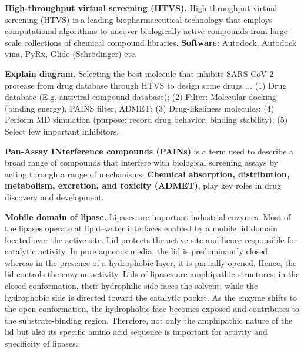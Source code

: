 \vspace{0.1em}\noindent
\textbf{High-throughput virtual screening (HTVS).} High-throughput virtual screening (HTVS) is a leading biopharmaceutical technology that employs computational algorithms to uncover biologically active compounds from large-scale collections of chemical compound libraries. \textbf{Software}: Autodock, Autodock vina, PyRx, Glide (Schrödinger) etc.

\vspace{0.1em}\noindent
\textbf{Explain diagram.} Selecting the best molecule that inhibits SARS-CoV-2 protease from drug database through HTVS to design some drugs ... (1) Drug database (E.g. antiviral compound database); (2) Filter: Molecular docking (binding energy), PAINS filter, ADMET; (3) Drug-likeliness molecules; (4) Perform MD simulation (purpose: record drug behavior, binding stability); (5) Select few important inhibitors. 

\vspace{0.1em}\noindent
\textbf{Pan-Assay INterference compounds (PAINs)} is a term used to describe a broad range of compounds that interfere with biological screening assays by acting through a range of mechanisms. \textbf{ Chemical absorption, distribution, metabolism, excretion, and toxicity (ADMET)}, play key roles in drug discovery and development. 

\vspace{0.1em}\noindent
\textbf{Mobile domain of lipase.} Lipases are important industrial enzymes. Most of the lipases operate at lipid–water interfaces enabled by a mobile lid domain located over the active site. Lid protects the active site and hence responsible for catalytic activity. In pure aqueous media, the lid is predominantly closed, whereas in the presence of a hydrophobic layer, it is partially opened. Hence, the lid controls the enzyme activity.
Lids of lipases are amphipathic structures; in the closed conformation, their hydrophilic side faces the solvent, while the hydrophobic side is directed toward the catalytic pocket. As the enzyme shifts to the open conformation, the hydrophobic face becomes exposed and contributes to the substrate-binding region. Therefore, not only the amphipathic nature of the lid but also its specific amino acid sequence is important for activity and specificity of lipases.

